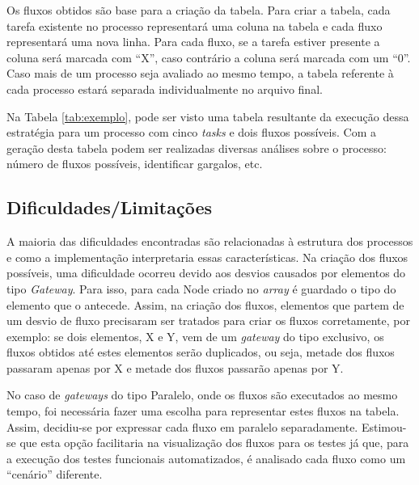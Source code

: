 \documentclass[12pt]{article}
\begin{document}
Os fluxos obtidos são base para a criação da tabela. Para criar a tabela, cada tarefa existente no processo representará uma coluna na tabela e cada fluxo representará uma nova linha. Para cada fluxo, se a tarefa estiver presente a coluna será marcada com ``X'', caso contrário a coluna será marcada com um ``0''. Caso mais de um processo seja avaliado ao mesmo tempo, a tabela referente à cada processo estará separada individualmente no arquivo final. 

Na Tabela \ref{tab:exemplo}, pode ser visto uma tabela resultante da execução dessa estratégia para um processo com cinco \emph{tasks} e dois fluxos possíveis. Com a geração desta tabela podem ser realizadas diversas análises sobre o processo: número de fluxos possíveis, identificar gargalos, etc.

\begin{table}[]
\centering
\caption{Exemplo de tabela resultante}
\label{tab:exemplo}
\end{table}

\subsection{Dificuldades/Limitações}
A maioria das dificuldades encontradas são relacionadas à estrutura dos processos e como a implementação interpretaria essas características. Na criação dos fluxos possíveis, uma dificuldade ocorreu devido aos desvios causados por elementos do tipo \emph{Gateway}. Para isso, para cada Node criado no \emph{array} é guardado o tipo do elemento que o antecede. Assim, na criação dos fluxos, elementos que partem de um desvio de fluxo precisaram ser tratados para criar os fluxos corretamente, por exemplo: se dois elementos, X e Y, vem de um \emph{gateway} do tipo  exclusivo, os fluxos obtidos até estes elementos serão duplicados, ou seja, metade dos fluxos passaram apenas por X e metade dos fluxos passarão apenas por Y.

No caso de \emph{gateways} do tipo Paralelo, onde os fluxos são executados ao mesmo tempo, foi necessária fazer uma escolha para representar estes fluxos na tabela. Assim, decidiu-se por expressar cada fluxo em paralelo separadamente. Estimou-se que esta opção facilitaria na visualização dos fluxos para os testes já que, para a execução dos testes funcionais automatizados, é analisado cada fluxo como um ``cenário'' diferente.
\end{document}
